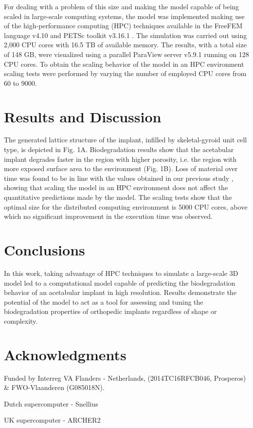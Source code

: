 For dealing with a problem of this size and making the model capable of being scaled in large-scale computing systems, the model was implemented making use of the high-performance computing (HPC) techniques available in the FreeFEM language v4.10 and PETSc toolkit v3.16.1 \cite{Barzegari2022}. The simulation was carried out using 2,000 CPU cores with 16.5 TB of available memory. The results, with a total size of 148 GB, were visualized using a parallel ParaView server v5.9.1 running on 128 CPU cores. To obtain the scaling behavior of the model in an HPC environment scaling tests were performed by varying the number of employed CPU cores from 60 to \num{9000}.


\section{Results and Discussion}

The generated lattice structure of the implant, infilled by skeletal-gyroid unit cell type, is depicted in Fig. 1A. Biodegradation results show that the acetabular implant degrades faster in the region with higher porosity, i.e. the region with more exposed surface area to the environment (Fig. 1B). Loss of material over time was found to be in line with the values obtained in our previous study \cite{Barzegari2021}, showing that scaling the model in an HPC environment does not affect the quantitative predictions made by the model.  The scaling tests show that the optimal size for the distributed computing environment is \num{5000} CPU cores, above which no significant improvement in the execution time was observed.

\section{Conclusions}

In this work, taking advantage of HPC techniques to simulate a large-scale 3D model led to a computational model capable of predicting the biodegradation behavior of an acetabular implant in high resolution. Results demonstrate the potential of the model to act as a tool for assessing and tuning the biodegradation properties of orthopedic  implants regardless of shape or complexity.

\section{Acknowledgments}

Funded by Interreg VA Flanders - Netherlands, (2014TC16RFCB046, Prosperos) \& FWO-Vlaanderen (G085018N).

Dutch supercomputer - Snellius

UK supercomputer - ARCHER2


\cleardoublepage

